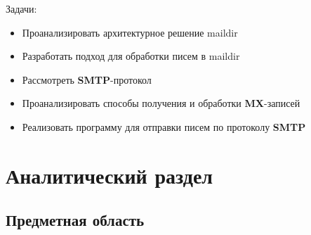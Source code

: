 \documentclass[a4paper,12pt]{report}
\begin{document}
Задачи:
\begin{itemize}
    \item Проанализировать архитектурное решение maildir
    \item Разработать подход для обработки писем в maildir 
    \item Рассмотреть \textbf{SMTP}-протокол
    \item Проанализировать способы получения и обработки \textbf{MX}-записей
    \item Реализовать программу для отправки писем по протоколу \textbf{SMTP}
\end{itemize}








\chapter*{Аналитический раздел}
\section*{Предметная область}
\end{document}
